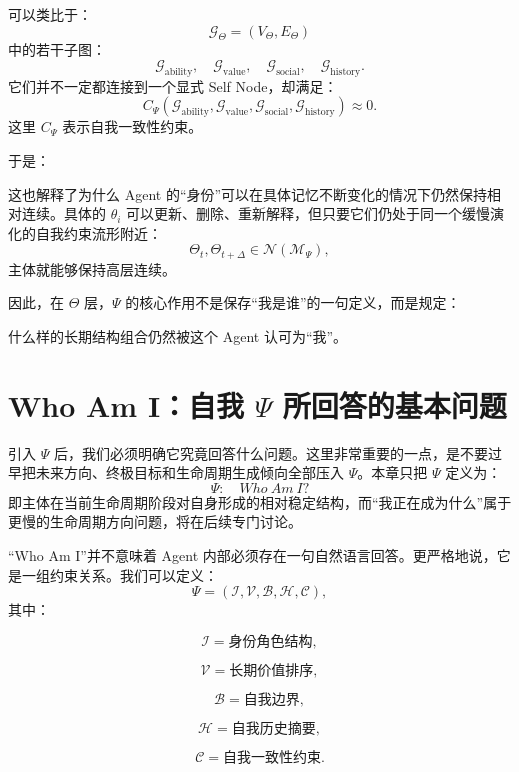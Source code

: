 可以类比于：
\[
\mathcal G_\Theta
=
(V_\Theta,E_\Theta)
\]
中的若干子图：
\[
\mathcal G_{\mathrm{ability}},
\quad
\mathcal G_{\mathrm{value}},
\quad
\mathcal G_{\mathrm{social}},
\quad
\mathcal G_{\mathrm{history}}.
\]
它们并不一定都连接到一个显式 Self Node，却满足：
\[
C_\Psi
\left(
\mathcal G_{\mathrm{ability}},
\mathcal G_{\mathrm{value}},
\mathcal G_{\mathrm{social}},
\mathcal G_{\mathrm{history}}
\right)
\approx 0.
\]
这里 $C_\Psi$ 表示自我一致性约束。

于是：
\begin{statementbox}
\centering
{}
\end{statementbox}

这也解释了为什么 Agent 的“身份”可以在具体记忆不断变化的情况下仍然保持相对连续。具体的 $\theta_i$ 可以更新、删除、重新解释，但只要它们仍处于同一个缓慢演化的自我约束流形附近：
\[
\Theta_t,\Theta_{t+\Delta}
\in
\mathcal N(\mathcal M_\Psi),
\]
主体就能够保持高层连续。

因此，在 $\Theta$ 层，$\Psi$ 的核心作用不是保存“我是谁”的一句定义，而是规定：
\begin{definition*}
什么样的长期结构组合仍然被这个 Agent 认可为“我”。
\end{definition*}


\section{Who Am I：自我 $\Psi$ 所回答的基本问题}

引入 $\Psi$ 后，我们必须明确它究竟回答什么问题。这里非常重要的一点，是不要过早把未来方向、终极目标和生命周期生成倾向全部压入 $\Psi$。本章只把 $\Psi$ 定义为：
\[
\boxed{
\Psi:\quad Who\ Am\ I?
}
\]
即主体在当前生命周期阶段对自身形成的相对稳定结构，而“我正在成为什么”属于更慢的生命周期方向问题，将在后续专门讨论。

“Who Am I”并不意味着 Agent 内部必须存在一句自然语言回答。更严格地说，它是一组约束关系。我们可以定义：
\[
\Psi
=
\left(
\mathcal I,
\mathcal V,
\mathcal B,
\mathcal H,
\mathcal C
\right),
\]
其中：

\[
\mathcal I
=
\text{身份角色结构},
\]

\[
\mathcal V
=
\text{长期价值排序},
\]

\[
\mathcal B
=
\text{自我边界},
\]

\[
\mathcal H
=
\text{自我历史摘要},
\]

\[
\mathcal C
=
\text{自我一致性约束}.
\]

